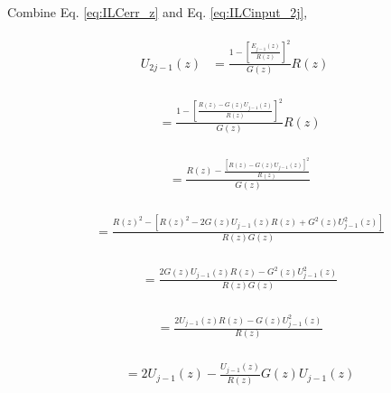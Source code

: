 \documentclass[a4paper, 12pt, twoside, openright]{mythesis}
\begin{document}
Combine Eq. \ref{eq:ILCerr_z} and Eq. \ref{eq:ILCinput_2j},

\begin{align}
\begin{split}
U_{2j-1}(z) &=\frac{1-[\frac{E_{j-1}(z)}{R(z)}]^{2}}{G(z)}R(z)
\end{split}
\end{align}

\begin{align}
\begin{split}
&=\frac{1-[\frac{R(z)-G(z)U_{j-1}(z)}{R(z)}]^{2}}{G(z)}R(z)
\end{split}
\end{align}

\begin{align}
\begin{split}
&= \frac{R(z)-\frac{[R(z)-G(z)U_{j-1}(z)]^2}{R(z)}}{G(z)}
\end{split}
\end{align}

\begin{align}
\begin{split}
&= \frac{R(z)^2-[R(z)^2-2G(z)U_{j-1}(z)R(z)+G^2(z)U_{j-1}^2(z)]}{R(z)G(z)}
\end{split}
\end{align}



\begin{align}
\begin{split}
&= \frac{2G(z)U_{j-1}(z)R(z)-G^2(z)U_{j-1}^2(z)}{R(z)G(z)}
\end{split}
\end{align}

\begin{align}
\begin{split}
&= \frac{2U_{j-1}(z)R(z)-G(z)U_{j-1}^2(z)}{R(z)}
\end{split}
\end{align}

\begin{align}
\begin{split}
&= 2U_{j-1}(z)-\frac{U_{j-1}(z)}{R(z)}G(z)U_{j-1}(z)
\end{split}
\end{align}
\end{document}
